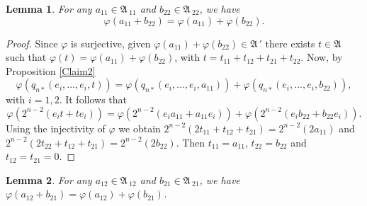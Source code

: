 \documentclass{amsart}
\newtheorem{lemma}{Lemma}[section]
\def\A{{\mathfrak A}\, }
\begin{document}
\begin{lemma}\label{lema1} For any $a_{11} \in \A_{11}$ and $b_{22} \in \A_{22}$, we have 
$$\varphi(a_{11} + b_{22}) = \varphi(a_{11}) + \varphi(b_{22}).$$
\end{lemma}
\begin{proof}
Since $\varphi$ is surjective, given $\varphi(a_{11})+\varphi(b_{22}) \in \A'$ there exists $t \in \A$ such that 
$\varphi(t) = \varphi(a_{11})+\varphi(b_{22})$, with $t=t_{11}+t_{12}+t_{21}+t_{22}$. Now, by Proposition \ref{Claim2}
$$
\varphi(q_{n*}(e_i,...,e_i,t)) = \varphi(q_{n*}(e_i,...,e_i,a_{11})) + \varphi(q_{n*}(e_i,...,e_i,b_{22})),
$$
with $i=1,2$. It follows that
$$
\varphi(2^{n-2}(e_it + te_i)) = \varphi(2^{n-2}(e_ia_{11} + a_{11}e_i)) + \varphi(2^{n-2}(e_ib_{22} + b_{22}e_i)).
$$
Using the injectivity of $\varphi$ we obtain
$2^{n-2}(2t_{11} + t_{12} + t_{21}) = 2^{n-2}(2a_{11})$ and
$2^{n-2}(2t_{22} + t_{12} + t_{21}) = 2^{n-2}(2b_{22}).$ Then $t_{11}=a_{11}$, $t_{22}=b_{22}$ and $t_{12}=t_{21}=0$.
\end{proof}

\begin{lemma}\label{lema2}
For any $a_{12} \in \A_{12}$ and $b_{21} \in \A_{21}$, we have $\varphi(a_{12} + b_{21}) = \varphi(a_{12}) + \varphi(b_{21})$.
\end{lemma}
\end{document}
